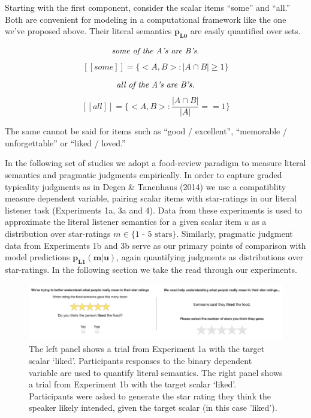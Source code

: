 \documentclass[10pt, letterpaper]{article}
\newenvironment{CodeChunk}{}{}
\begin{document}
Starting with the first component, consider the scalar items ``some''
and ``all.'' Both are convenient for modeling in a computational
framework like the one we've proposed above. Their literal semantics
\(\mathbf{p_{L0}}\) are easily quantified over sets.

\[\text{\textit{some of the A's are B's.}}\]
\[[[some]] = \{<A, B> : |A \cap B| \geq 1 \}\]

\[\text{\textit{all of the A's are B's.}}\]
\[[[all]] = \{<A, B> : \frac{|A \cap B|}{|A|} == 1 \}\]

The same cannot be said for items such as ``good / excellent'',
``memorable / unforgettable'' or ``liked / loved.''

In the following set of studies we adopt a food-review paradigm to
measure literal semantics and pragmatic judgments empirically. In order
to capture graded typicality judgments as in Degen \& Tanenhaus (2014)
we use a compatiblity measure dependent variable, pairing scalar items
with star-ratings in our literal listener task (Experiments 1a, 3a and
4). Data from these experiments is used to approximate the literal
listener semantics for a given scalar item \(u\) as a distribution over
star-ratings \(m \in \text{\{1 - 5 stars\}}\). Similarly, pragmatic
judgment data from Experiments 1b and 3b serve as our primary points of
comparison with model predictions \(\mathbf{p_{L1}(m|u)}\), again
quantifying judgments as distributions over star-ratings. In the
following section we take the read through our experiments.

\begin{CodeChunk}
\begin{figure}[t]

{\centering \includegraphics{figs/stimuli_exp1-1} 

}

\caption[The left panel shows a trial from Experiment 1a with the target scalar `liked']{The left panel shows a trial from Experiment 1a with the target scalar `liked'. Participants responses to the binary dependent variable are used to quantify literal semantics. The right panel shows a trial from Experiment 1b with the target scalar `liked'. Participants were asked to generate the star rating they think the speaker likely intended, given the target scalar (in this case 'liked').}\label{fig:stimuli_exp1}
\end{figure}
\end{CodeChunk}
\end{document}

